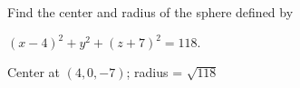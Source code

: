 {Find the center and radius of the sphere defined by

$(x-4)^2+y^2+(z+7)^2=118.$
}
{Center at $(4,0,-7)$; radius = $\sqrt{118}$
}
